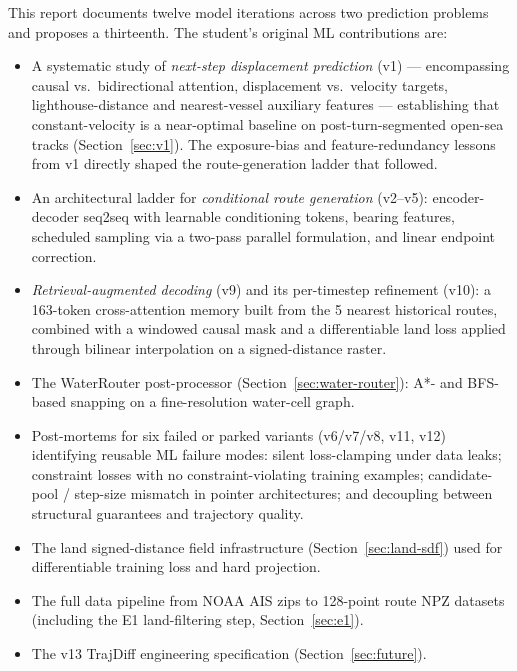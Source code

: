 \documentclass[11pt,a4paper]{article}
\begin{document}
This report documents twelve model iterations across two prediction problems
and proposes a thirteenth.
The student's original ML contributions are:
\begin{itemize}
  \item A systematic study of \emph{next-step displacement prediction} (v1) ---
        encompassing causal vs.\ bidirectional attention, displacement vs.\
        velocity targets, lighthouse-distance and nearest-vessel auxiliary
        features --- establishing that constant-velocity is a near-optimal
        baseline on post-turn-segmented open-sea tracks (Section~\ref{sec:v1}).
        The exposure-bias and feature-redundancy lessons from v1 directly
        shaped the route-generation ladder that followed.
  \item An architectural ladder for \emph{conditional route generation}
        (v2--v5): encoder-decoder seq2seq with learnable conditioning tokens,
        bearing features, scheduled sampling via a two-pass parallel
        formulation, and linear endpoint correction.
  \item \emph{Retrieval-augmented decoding} (v9) and its per-timestep
        refinement (v10): a 163-token cross-attention memory built from the
        5 nearest historical routes, combined with a windowed causal mask
        and a differentiable land loss applied through bilinear
        interpolation on a signed-distance raster.
  \item The WaterRouter post-processor (Section~\ref{sec:water-router}):
        A*- and BFS-based snapping on a fine-resolution water-cell graph.
  \item Post-mortems for six failed or parked variants (v6/v7/v8, v11, v12)
        identifying reusable ML failure modes: silent loss-clamping under data
        leaks; constraint losses with no constraint-violating training examples;
        candidate-pool / step-size mismatch in pointer architectures; and
        decoupling between structural guarantees and trajectory quality.
  \item The land signed-distance field infrastructure
        (Section~\ref{sec:land-sdf}) used for differentiable training loss and
        hard projection.
  \item The full data pipeline from NOAA AIS zips to 128-point route NPZ
        datasets (including the E1 land-filtering step, Section~\ref{sec:e1}).
  \item The v13 TrajDiff engineering specification (Section~\ref{sec:future}).
\end{itemize}
\end{document}
